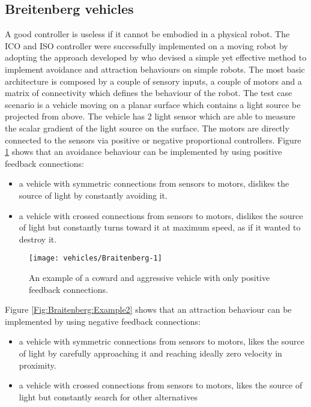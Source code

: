 \subsection{Breitenberg vehicles \label{Intro:Braitenberg}}

A good controller is useless if it cannot be embodied in a physical robot.
The ICO and ISO controller were successfully implemented on a moving robot by
 adopting the approach developed by \citet{Braitenberg84} who devised a simple
 yet effective method to implement avoidance and attraction behaviours on 
simple robots.
The most basic architecture is composed by a couple of sensory inputs, a couple of motors
and a matrix of connectivity which defines the behaviour of the robot.
The test case scenario is a vehicle moving on a planar surface which contains a light source
 be projected from above.
The vehicle has 2 light sensor which are able to measure the scalar gradient of 
the light source on the surface.
The motors are directly connected to the sensors via positive or negative proportional 
controllers.
Figure \ref{Fig:Braitenberg:Example1} shows that an avoidance behaviour can be implemented
 by using positive feedback connections:

\begin{itemize}
 \item a vehicle with symmetric connections from sensors to motors, dislikes the source 
of light by constantly avoiding it.
 \item a vehicle with crossed connections from sensors to motors, dislikes the source of light
but constantly turns toward it at maximum speed, as if it wanted to destroy it.
\end{itemize}

\begin{figure}[htbp]
\begin{center}
\texttt{[image: vehicles/Braitenberg-1]}
\end{center}
\small{
\caption[Braitenberg vehicles positive feedback]{
An example of a coward and aggressive vehicle with only positive feedback connections.
\label{Fig:Braitenberg:Example1}}}
\end{figure}

Figure \ref{Fig:Braitenberg:Example2} shows that an attraction behaviour can be implemented
 by using negative feedback connections:
\begin{itemize}
 \item a vehicle with symmetric connections from sensors to motors, likes the source 
of light by carefully approaching it and reaching ideally zero velocity in proximity.
 \item a vehicle with crossed connections from sensors to motors, likes the source of light
but constantly search for other alternatives 
\end{itemize}

